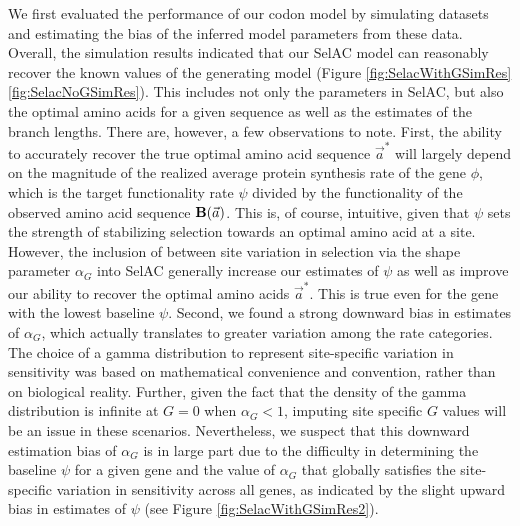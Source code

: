 \documentclass[onecolumn,letterpaper,fleqn,nogrid]{myMBE}%
\newcommand{\Func}{\ensuremath{\text{\textbf{B}}}\xspace}
\newcommand{\selac}{SelAC\xspace}
\newcommand{\alphag}{\ensuremath{\alpha_G}\xspace}
\newcommand{\aoptvec}{\ensuremath{\Vec{a}^*}\xspace}
\newcommand{\avec}{\ensuremath{\Vec{a}}\xspace}
\begin{document}
We first evaluated the performance of our codon model by simulating datasets and estimating the bias of the inferred model parameters from these data.
Overall, the simulation results indicated that our SelAC model can reasonably recover the known values of the generating model (Figure \ref{fig:SelacWithGSimRes}\ref{fig:SelacNoGSimRes}).
This includes not only the parameters in \selac, but also the optimal amino acids for a given sequence as well as the estimates of the branch lengths.
There are, however, a few observations to note.
First, the ability to accurately recover the true optimal amino acid sequence \aoptvec will largely depend on the magnitude of the realized average protein synthesis rate of the gene $\phi$, which is the target functionality rate $\psi$ divided by the functionality of the observed amino acid sequence $\Func(\avec)$.
This is, of course, intuitive, given that $\psi$ sets the strength of stabilizing selection towards an optimal amino acid at a site.
However, the inclusion of between site variation in selection via the shape parameter $\alphag$ into \selac generally increase our estimates of $\psi$ as well as improve our ability to recover the optimal amino acids \aoptvec.
This is true even for the gene with the lowest baseline $\psi$.
Second, we found a strong downward bias in estimates of $\alphag$, which actually translates to greater variation among the rate categories.
The choice of a gamma distribution to represent site-specific variation in sensitivity was based on mathematical convenience and convention, rather than on biological reality.
Further, given the fact that the density of the gamma distribution is infinite at $G=0$ when $\alphag < 1$, imputing site specific $G$ values will be an issue in these scenarios.
Nevertheless, we suspect that this downward estimation bias of \alphag is in large part due to the difficulty in determining the baseline $\psi$ for a given gene and the value of $\alphag$ that globally satisfies the site-specific variation in sensitivity across all genes, as indicated by the slight upward bias in estimates of $\psi$ (see Figure \ref{fig:SelacWithGSimRes2}).
\end{document}
